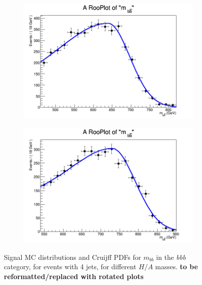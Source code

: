 \begin{figure}[phtb!]
\begin{center}
  \begin{subfigure}[$m_{A}=700$ GeV]{0.4\textwidth}\includegraphics[width=\textwidth]{FitResults/images/fitMC_bAbb700_2.png}\end{subfigure}
  \begin{subfigure}[$m_{A}=800$ GeV]{0.4\textwidth}\includegraphics[width=\textwidth]{FitResults/images/fitMC_bAbb800_2.png}\end{subfigure}
  \caption{Signal MC distributions and Cruijff PDFs for $m_{bb}$ in the {\it bbb} category, for events with 4 jets, for different $H/A$ masses. \textbf{to be reformatted/replaced with rotated plots}\label{fig:signalPDFs_4j}}
    \end{center}
\end{figure}

